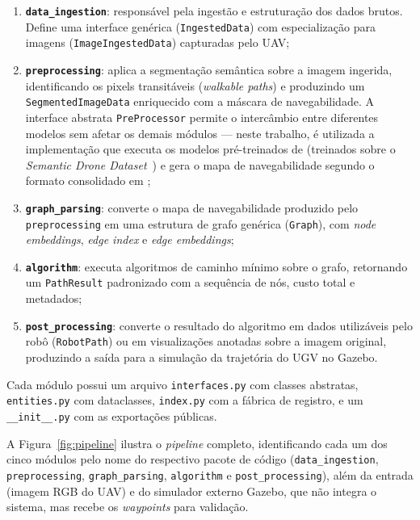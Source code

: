 \documentclass[
    12pt,
    openright,
    oneside,
    a4paper,
    english,
    brazil
]{abntex2}
\begin{document}
\begin{enumerate}
    \item \textbf{\texttt{data\_ingestion}}: responsável pela ingestão e estruturação dos dados brutos. Define uma interface genérica (\texttt{IngestedData}) com especialização para imagens (\texttt{ImageIngestedData}) capturadas pelo UAV;
    \item \textbf{\texttt{preprocessing}}: aplica a segmentação semântica sobre a imagem ingerida, identificando os pixels transitáveis (\textit{walkable paths}) e produzindo um \texttt{SegmentedImageData} enriquecido com a máscara de navegabilidade. A interface abstrata \texttt{PreProcessor} permite o intercâmbio entre diferentes modelos sem afetar os demais módulos --- neste trabalho, é utilizada a implementação que executa os modelos pré-treinados de \cite{junior2024_models} (treinados sobre o \emph{Semantic Drone Dataset}~\cite{drone_dataset}) e gera o mapa de navegabilidade segundo o formato consolidado em \cite{junior2025_rrt};
    \item \textbf{\texttt{graph\_parsing}}: converte o mapa de navegabilidade produzido pelo \texttt{preprocessing} em uma estrutura de grafo genérica (\texttt{Graph}), com \textit{node embeddings}, \textit{edge index} e \textit{edge embeddings};
    \item \textbf{\texttt{algorithm}}: executa algoritmos de caminho mínimo sobre o grafo, retornando um \texttt{PathResult} padronizado com a sequência de nós, custo total e metadados;
    \item \textbf{\texttt{post\_processing}}: converte o resultado do algoritmo em dados utilizáveis pelo robô (\texttt{RobotPath}) ou em visualizações anotadas sobre a imagem original, produzindo a saída para a simulação da trajetória do UGV no Gazebo.
\end{enumerate}

Cada módulo possui um arquivo \texttt{interfaces.py} com classes abstratas, \texttt{entities.py} com dataclasses, \texttt{index.py} com a fábrica de registro, e um \texttt{\_\_init\_\_.py} com as exportações públicas.

A Figura~\ref{fig:pipeline} ilustra o \textit{pipeline} completo, identificando cada um dos cinco módulos pelo nome do respectivo pacote de código (\texttt{data\_ingestion}, \texttt{preprocessing}, \texttt{graph\_parsing}, \texttt{algorithm} e \texttt{post\_processing}), além da entrada (imagem RGB do UAV) e do simulador externo Gazebo, que não integra o sistema, mas recebe os \textit{waypoints} para validação.
\end{document}
